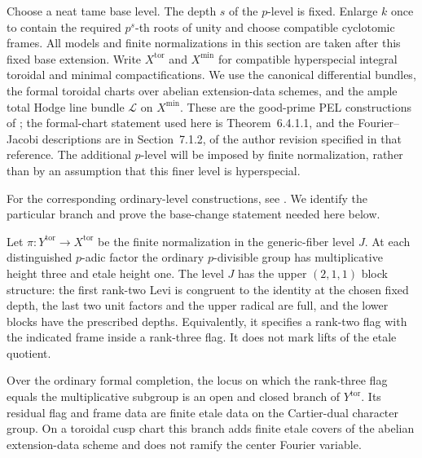 Choose a neat tame base level.  The depth $s$ of the $p$-level is
fixed.  Enlarge $k$ once to contain the required $p^s$-th roots of
unity and choose compatible cyclotomic frames.  All models and
finite normalizations in this section are taken after this fixed
base extension.  Write $X^{\mathrm{tor}}$ and
$X^{\min}$ for compatible hyperspecial integral toroidal and minimal
compactifications.  We use the canonical differential bundles, the
formal toroidal charts over abelian extension-data schemes, and the
ample total Hodge line bundle $\mathcal L$ on $X^{\min}$.  These are
the good-prime PEL constructions of \citet{Lan2013}; the formal-chart
statement used here is Theorem~6.4.1.1, and the Fourier--Jacobi
descriptions are in Section~7.1.2, of the author revision specified in
that reference.  The additional $p$-level will be imposed by finite
normalization, rather than by an assumption that this finer level is
hyperspecial.

For the corresponding ordinary-level constructions, see
\citet[Definition~3.2.2.9 and Propositions~5.2.3.3,
5.2.3.18]{Lan2018Ordinary}.  We identify the particular branch and
prove the base-change statement needed here below.

Let $\pi:Y^{\mathrm{tor}}\to X^{\mathrm{tor}}$ be the finite
normalization in the generic-fiber level $J$.  At each distinguished
$p$-adic factor the ordinary $p$-divisible group has multiplicative
height three and etale height one.  The level $J$ has the upper
$(2,1,1)$ block structure: the first rank-two Levi is congruent to the
identity at the chosen fixed depth, the last two unit factors and the
upper radical are full, and the lower blocks have the prescribed
depths.  Equivalently, it specifies a rank-two flag with the indicated
frame inside a rank-three flag.  It does not mark lifts of the etale
quotient.

\begin{lemma}
\label{lem:canonical-ordinary-level}
Over the ordinary formal completion, the locus on which the
rank-three flag equals the multiplicative subgroup is an open and
closed branch of $Y^{\mathrm{tor}}$.  Its residual flag and frame
data are finite etale data on the Cartier-dual character group.
On a toroidal cusp chart this branch adds finite etale covers of the
abelian extension-data scheme and does not ramify the center Fourier
variable.
\end{lemma}

